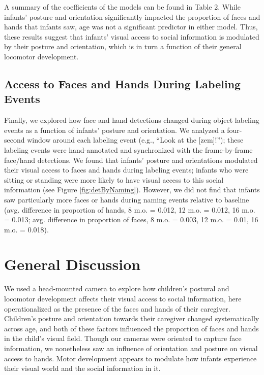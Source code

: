 \documentclass[10pt, letterpaper]{article}
\begin{document}
A summary of the coefficients of the models can be found in Table 2.
While infants' posture and orientation significantly impacted the
proportion of faces and hands that infants saw, age was not a
significant predictor in either model. Thus, these results suggest that
infants' visual access to social information is modulated by their
posture and orientation, which is in turn a function of their general
locomotor development.

\subsection{Access to Faces and Hands During Labeling
Events}\label{access-to-faces-and-hands-during-labeling-events}

Finally, we explored how face and hand detections changed during object
labeling events as a function of infants' posture and orientation. We
analyzed a four-second window around each labeling event (e.g., ``Look
at the {[}zem{]}!''); these labeling events were hand-annotated and
synchronized with the frame-by-frame face/hand detections. We found that
infants' posture and orientations modulated their visual access to faces
and hands during labeling events; infants who were sitting or standing
were more likely to have visual access to this social information (see
Figure \ref{fig:detByNaming}). However, we did not find that infants saw
particularly more faces or hands during naming events relative to
baseline (avg. difference in proportion of hands, 8 m.o. = 0.012, 12
m.o. = 0.012, 16 m.o. = 0.013; avg. difference in proportion of faces, 8
m.o. = 0.003, 12 m.o. = 0.01, 16 m.o. = 0.018).

\section{General Discussion}\label{general-discussion}

We used a head-mounted camera to explore how children's postural and
locomotor development affects their visual access to social information,
here operationalized as the presence of the faces and hands of their
caregiver. Children's posture and orientation towards their caregiver
changed systematically across age, and both of these factors influenced
the proportion of faces and hands in the child's visual field. Though
our cameras were oriented to capture face information, we nonetheless
saw an influence of orientation and posture on visual access to hands.
Motor development appears to modulate how infants experience their
visual world and the social information in it.
\end{document}
